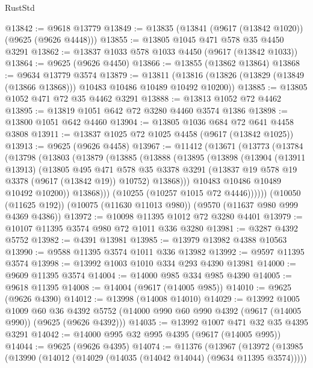 \begin{lexlean}{RustStd}
\begin{coremodule}
@13842 := @9618 @13779
@13849 := @13835 (@13841 (@9617 (@13842 @1020)) (@9625 (@9626 @4448)))
@13855 := @13805 @1045 @471 @578 @35 @4450 @3291
@13862 := @13837 @1033 @578 @1033 @4450 (@9617 (@13842 @1033))
@13864 := @9625 (@9626 @4450)
@13866 := @13855 (@13862 @13864)
@13868 := @9634 @13779 @3574
@13879 := @13811
    (@13816 (@13826 (@13829 (@13849 (@13866 @13868))) @10483 @10486 @10489 @10492 @10200))
@13885 := @13805 @1052 @471 @72 @35 @4462 @3291
@13888 := @13813 @1052 @72 @4462
@13895 := @13819 @1051 @642 @72 @3280 @4460 @3574 @1386
@13898 := @13800 @1051 @642 @4460
@13904 := @13805 @1036 @684 @72 @641 @4458 @3808
@13911 := @13837 @1025 @72 @1025 @4458 (@9617 (@13842 @1025))
@13913 := @9625 (@9626 @4458)
@13967 := @11412
    (@13671
      (@13773
        (@13784
          (@13798
            (@13803
              (@13879
                (@13885
                  (@13888
                    (@13895
                      (@13898
                        (@13904
                          (@13911 @13913)
                          (@13805
                            @495
                            @471
                            @578
                            @35
                            @3378
                            @3291
                            (@13837 @19 @578 @19 @3378 (@9617 (@13842 @19)) @10752)
                            @13868)))
                      @10483
                      @10486
                      @10489
                      @10492
                      @10200))
                  @13868)))
            (@10255 (@10257 @1015 @72 @4446))))))
    (@10050 (@11625 @192))
    (@10075 (@11630 @11013 @980))
    (@9570 (@11637 @980 @999 @4369 @4386))
@13972 := @10098 @11395 @1012 @72 @3280 @4401
@13979 := @10107 @11395 @3574 @980 @72 @1011 @336 @3280
@13981 := @3287 @4392 @5752
@13982 := @4391 @13981
@13985 := @13979 @13982 @4388 @10563
@13990 := @9588 @11395 @3574 @1011 @336 @13982
@13992 := @9597 @11395 @3574
@13998 := @13992 @1003 @1010 @334 @293 @4390 @13981
@14000 := @9609 @11395 @3574
@14004 := @14000 @985 @334 @985 @4390
@14005 := @9618 @11395
@14008 := @14004 (@9617 (@14005 @985))
@14010 := @9625 (@9626 @4390)
@14012 := @13998 (@14008 @14010)
@14029 := @13992
    @1005
    @1009
    @60
    @36
    @4392
    @5752
    (@14000 @990 @60 @990 @4392 (@9617 (@14005 @990)) (@9625 (@9626 @4392)))
@14035 := @13992 @1007 @471 @32 @35 @4395 @3291
@14042 := @14000 @995 @32 @995 @4395 (@9617 (@14005 @995))
@14044 := @9625 (@9626 @4395)
@14074 := @11376
    (@13967
      (@13972
        (@13985
          (@13990 (@14012 (@14029 (@14035 (@14042 @14044) (@9634 @11395 @3574)))))

\end{coremodule}
\end{lexlean}
